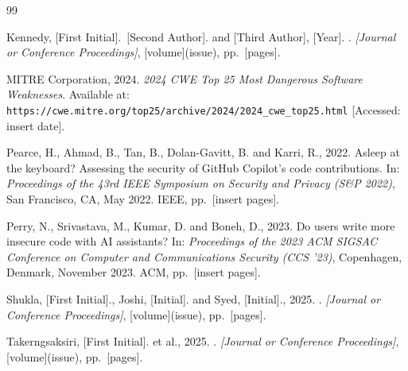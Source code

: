 \documentclass[11pt, a4paper]{article}
\begin{document}
\begin{thebibliography}{99}

Kennedy, [First Initial].~[Second Author]. and [Third Author], [Year].
.
\newblock \emph{[Journal or Conference Proceedings]}, [volume](issue), pp.~[pages].

MITRE Corporation, 2024.
\newblock \emph{2024 CWE Top 25 Most Dangerous Software Weaknesses}.
\newblock Available at: \texttt{https://cwe.mitre.org/top25/archive/2024/2024\_cwe\_top25.html} [Accessed: insert date].

Pearce, H., Ahmad, B., Tan, B., Dolan-Gavitt, B. and Karri, R., 2022.
\newblock Asleep at the keyboard? {A}ssessing the security of {G}it{H}ub {C}opilot's code contributions.
\newblock In: \emph{Proceedings of the 43rd IEEE Symposium on Security and Privacy (S\&P 2022)}, San Francisco, CA, May 2022. IEEE, pp.~[insert pages].

Perry, N., Srivastava, M., Kumar, D. and Boneh, D., 2023.
\newblock Do users write more insecure code with {AI} assistants?
\newblock In: \emph{Proceedings of the 2023 ACM SIGSAC Conference on Computer and Communications Security (CCS '23)}, Copenhagen, Denmark, November 2023. ACM, pp.~[insert pages].

Shukla, [First Initial]., Joshi, [Initial]. and Syed, [Initial]., 2025.
.
\newblock \emph{[Journal or Conference Proceedings]}, [volume](issue), pp.~[pages].

Takerngsaksiri, [First Initial]. et al., 2025.
.
\newblock \emph{[Journal or Conference Proceedings]}, [volume](issue), pp.~[pages].

\end{thebibliography}
\end{document}

